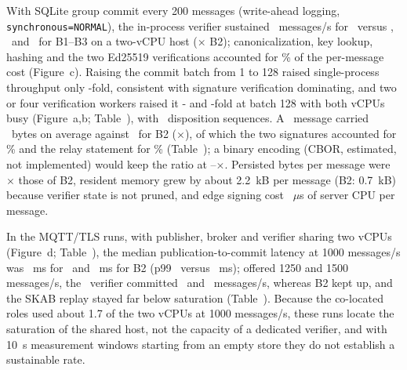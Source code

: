 With SQLite group commit every 200 messages (write-ahead logging, \texttt{synchronous=\allowbreak{}NORMAL}), the in-process verifier sustained \RTpPBTI\ messages/s for \sys\ versus \RTpBOne, \RTpBTwo\ and \RTpBThree\ for B1--B3 on a two-vCPU host (\RTpRatioBTwo$\times$ B2); canonicalization, key lookup, hashing and the two Ed25519 verifications accounted for \XStageCryptoShare\% of the per-message cost (Figure~c). Raising the commit batch from 1 to 128 raised single-process throughput only \VBtPBTIgainbatch-fold, consistent with signature verification dominating, and two or four verification workers raised it \VBtPBTIgainworkers- and \VBtPBTIgainworkersfour-fold at batch 128 with both vCPUs busy (Figure~a,b; Table~), with \VBatchSemanticsIdentical\ disposition sequences. A \sys\ message carried \RWirePBTI\ bytes on average against \RWireBTwo\ for B2 (\RWireRatioBTwo$\times$), of which the two signatures accounted for \XMbSigShare\% and the relay statement for \XMbRelShare\% (Table~); a binary encoding (CBOR, estimated, not implemented) would keep the ratio at \XMbBinTxtRatio--\XMbBinIntRatio$\times$. Persisted bytes per message were \RDbRatioBTwo$\times$ those of B2, resident memory grew by about 2.2~kB per message (B2: 0.7~kB) because verifier state is not pruned, and edge signing cost \REdgePBTI~$\mu$s of server CPU per message.

In the MQTT/TLS runs, with publisher, broker and verifier sharing two vCPUs (Figure~d; Table~), the median publication-to-commit latency at 1000 messages/s was \VEePBTIrOneZeroZeroZeropfifty~ms for \sys\ and \VEeBTworOneZeroZeroZeropfifty~ms for B2 (p99 \VEePBTIrOneZeroZeroZeropninetynine\ versus \VEeBTworOneZeroZeroZeropninetynine~ms); offered 1250 and 1500 messages/s, the \sys\ verifier committed \VEePBTIrOneTwoFiveZerotp\ and \VEePBTIrOneFiveZeroZerotp~messages/s, whereas B2 kept up, and the SKAB replay stayed far below saturation (Table~). Because the co-located roles used about 1.7 of the two vCPUs at 1000 messages/s, these runs locate the saturation of the shared host, not the capacity of a dedicated verifier, and with 10~s measurement windows starting from an empty store they do not establish a sustainable rate.
